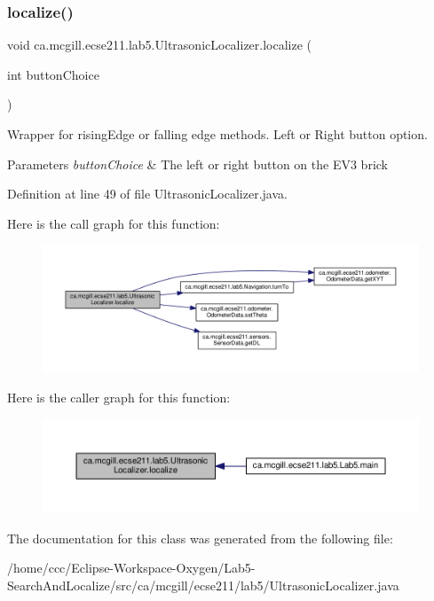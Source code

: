 \subsubsection{\texorpdfstring{localize()}{localize()}}
{\footnotesize\ttfamily void ca.\+mcgill.\+ecse211.\+lab5.\+Ultrasonic\+Localizer.\+localize (\begin{DoxyParamCaption}\item[{int}]{button\+Choice }\end{DoxyParamCaption})}

Wrapper for rising\+Edge or falling edge methods. Left or Right button option.


\begin{DoxyParams}{Parameters}
{\em button\+Choice} & The left or right button on the E\+V3 brick \\
\hline
\end{DoxyParams}


Definition at line 49 of file Ultrasonic\+Localizer.\+java.

Here is the call graph for this function\+:
\nopagebreak
\begin{figure}[H]
\begin{center}
\leavevmode
\includegraphics[width=350pt]{classca_1_1mcgill_1_1ecse211_1_1lab5_1_1_ultrasonic_localizer_a7fd82ab7240a07ae6947313c0769d4bc_cgraph}
\end{center}
\end{figure}
Here is the caller graph for this function\+:
\nopagebreak
\begin{figure}[H]
\begin{center}
\leavevmode
\includegraphics[width=350pt]{classca_1_1mcgill_1_1ecse211_1_1lab5_1_1_ultrasonic_localizer_a7fd82ab7240a07ae6947313c0769d4bc_icgraph}
\end{center}
\end{figure}


The documentation for this class was generated from the following file\+:\begin{DoxyCompactItemize}
\item 
/home/ccc/\+Eclipse-\/\+Workspace-\/\+Oxygen/\+Lab5-\/\+Search\+And\+Localize/src/ca/mcgill/ecse211/lab5/Ultrasonic\+Localizer.\+java\end{DoxyCompactItemize}
